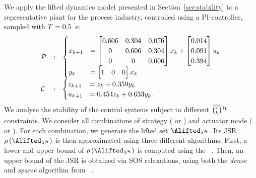We apply the lifted dynamics model presented in Section~\ref{sec:stability} to a representative plant for the process industry, controlled using a PI-controller, sampled with $T = 0.5$~s:
\begin{equation*}
    \begin{array}{lcl}
        \mathcal{P} & : &\begin{cases}
            x_{k+1} &= \begin{bmatrix}
                0.606 & 0.304 & 0.076 \\
                0 & 0.606 & 0.304 \\
                0 & 0 & 0.606 \\
            \end{bmatrix} x_k + \begin{bmatrix}
                0.014 \\
                0.091 \\
                0.394 \\
            \end{bmatrix} u_k \\
            y_k &= \begin{bmatrix}1 & 0 & 0\end{bmatrix} x_k
        \end{cases}\\
        \mathcal{C} & : &\begin{cases}
            z_{k+1} &= z_k + 0.359 y_k \\
            u_{k+1} &= 0.454 z_k + 0.633 y_k.  
        \end{cases}
    \end{array}
\end{equation*}
We analyse the stability of the control systems subject to different $\eanymiss{}{\strat}$ constraints.
We consider all combinations of strategy (\tK{} or \tS{}) and actuator mode (\tZ{} or \tH{}).
%
For each combination, we generate the lifted set $\Alifted_{\lambda^\strat}$. Its JSR $\rho \left( \Alifted_{\lambda^\strat} \right)$ is then approximated using three different algorithms.
First, a lower and upper bound of $\rho \left( \Alifted_{\lambda^\strat} \right)$ is computed using the ~\cite{vankeerberghen2014jsr}.
Then, an upper bound of the JSR is obtained via SOS relaxations, using both the \emph{dense} and \emph{sparse} algorithm from ~\cite{sparsejsr}.

\afterpage{
    \clearpage
    \begin{landscape}
        
    \end{landscape}
    \clearpage
}

